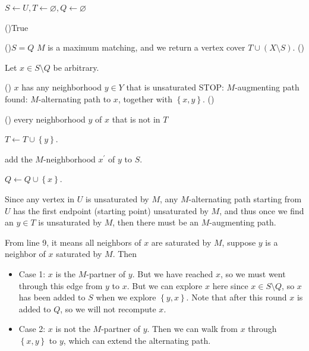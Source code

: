 \begin{algorithm}[H]
    \caption{Augmenting Path Algorithm}
    \(S \gets U, T \gets \varnothing, Q \gets \varnothing\)
    
    \While(){True} {
        \If(){\(S = Q\)}{
            \(M\) is a maximum matching, and we return a vertex cover \(T \cup (X \setminus S)\).
        } \Else() {
            Let \(x \in S \setminus Q\) be arbitrary. 

            \If() {\(x\) has any neighborhood \(y \in Y\) that is unsaturated} {
                STOP: \(M\)-augmenting path found: \(M\)-alternating path to \(x\), together with \(\left\{ x, y \right\} \).    
            } \Else() {
                \For() {every neighborhood \(y\) of \(x\) that is not in \(T\)} {
                    \(T \gets T \cup \left\{ y \right\} \). 

                    add the \(M\)-neighborhood \(x^{\prime} \) of \(y\) to \(S\).     
                }
            }
            \(Q \gets Q \cup \left\{ x \right\} \). 
        }
    }
\end{algorithm}

\begin{observation}
    Since any vertex in \(U\) is unsaturated by \(M\), any \(M\)-alternating path starting from \(U\) has the first endpoint (starting point) unsaturated by \(M\), and thus once we find an \(y \in T\) is unsaturated by \(M\), then there must be an \(M\)-augmenting path.        
\end{observation}

\begin{remark}
    From line 9, it means all neighbors of \(x\) are saturated by \(M\), suppose \(y\) is a neighbor of \(x\) saturated by \(M\). Then 
    \begin{itemize}
        \item Case 1: \(x\) is the \(M\)-partner of \(y\). But we have reached \(x\), so we must went through this edge from \(y\) to \(x\). But we can explore \(x\) here since \(x \in S \setminus Q\), so \(x\) has been added to \(S\) when we explore \(\left\{ y, x \right\} \). Note that after this round \(x\) is added to \(Q\), so we will not recompute \(x\).          
        \item Case 2: \(x\) is not the \(M\)-partner of \(y\). Then we can walk from \(x\) through \(\left\{ x, y \right\} \) to \(y\), which can extend the alternating path.               
    \end{itemize}     
\end{remark}

